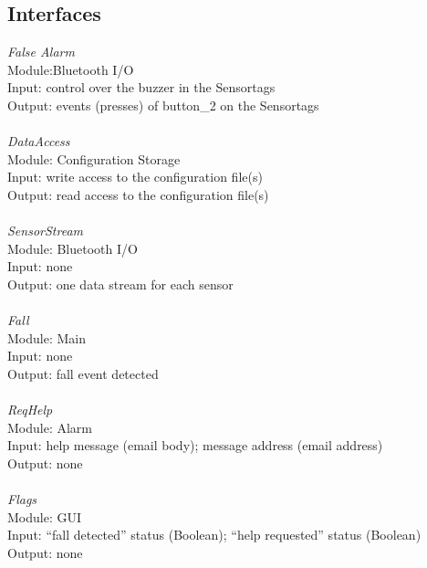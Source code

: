 \documentclass[conference,12pt]{IEEETran}
\begin{document}
\subsection{Interfaces}
\textit{False Alarm}
\\Module:Bluetooth I/O
\\Input: control over the buzzer in the Sensortags
\\Output: events (presses) of button\_2 on the Sensortags
\\\\\textit{DataAccess}
\\Module: Configuration Storage
\\Input: write access to the configuration file(s)
\\Output: read access to the configuration file(s)
\\\\\textit{SensorStream}
\\Module: Bluetooth I/O
\\Input: none
\\Output: one data stream for each sensor
\\\\\textit{Fall}
\\Module: Main
\\Input: none
\\Output: fall event detected
\\\\\textit{ReqHelp}
\\Module: Alarm
\\Input: help message (email body); message address (email address)
\\Output: none
\\\\\textit{Flags}
\\Module: GUI
\\Input: “fall detected” status (Boolean); “help requested” status (Boolean)
\\Output: none
\end{document}
